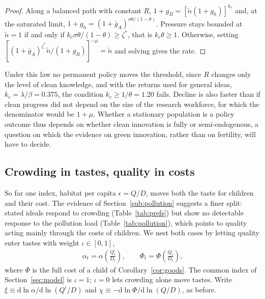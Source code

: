 \documentclass[11pt]{article}
\begin{document}
\begin{proof}
Along a balanced path with constant $R$, $1+g_B=[\tilde n(1+g_h)]^{k_c}$ and, at the saturated limit,
$1+g_h=(1+\bar g_A)^{\sigma\theta/(1-\theta)}$. Pressure stays bounded at $\tilde n=1$ if and only if
$k_c\sigma\theta/(1-\theta)\ge\zeta^\ast$, that is $k_c\theta\ge1$. Otherwise, setting
$[(1+\bar g_A)^{\zeta^\ast}\tilde n/(1+g_B)]^{-\mu}=\tilde n$ and solving gives the rate.
\end{proof}

Under this law no permanent policy moves the threshold, since $R$ changes only the level of clean
knowledge, and with the returns used for general ideas, $k_c=\lambda/\beta=0.375$, the condition
$k_c\ge1/\theta=1.20$ fails. Decline is also faster than if clean progress did not depend on the size of
the research workforce, for which the denominator would be $1+\mu$. Whether a stationary population is a policy outcome thus
depends on whether clean innovation is fully or semi-endogenous, a question on which the evidence on
green innovation, rather than on fertility, will have to decide.

\subsection{Crowding in tastes, quality in costs}
\label{sub:split}
So far one index, habitat per capita $\epsilon=Q/D$, moves both the taste for children and their cost.
The evidence of Section~\ref{sub:pollution} suggests a finer split: stated ideals respond to crowding (Table~\ref{tab:prefs}) but show no detectable response to the
pollution load (Table~\ref{tab:pollution}), which points to quality acting mainly through
the costs of children. We nest both cases by letting quality enter tastes with weight $\iota\in[0,1]$,
\begin{align}
\alpha_t=\alpha\!\left(\frac{Q_t^{\iota}}{D_t}\right),
\qquad
\Phi_t=\Phi\!\left(\frac{Q_t}{D_t}\right),
\label{eq:split}
\end{align}
where $\Phi$ is the full cost of a child of Corollary~\ref{cor:goods}. The common index of
Section~\ref{sec:model} is $\iota=1$; $\iota=0$ lets crowding alone move tastes. Write
$\xi\equiv\mathrm{d}\ln\alpha/\mathrm{d}\ln(Q^{\iota}/D)$ and $\chi\equiv-\mathrm{d}\ln\Phi/\mathrm{d}\ln(Q/D)$, as
before.
\end{document}
